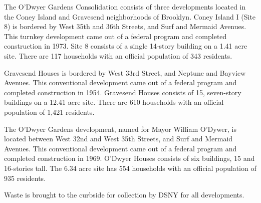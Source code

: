 The O'Dwyer Gardens Consolidation consists of three developments located in the Coney Island and Gravesend neighborhoods of Brooklyn. Coney Island I (Site 8) is bordered by West 35th and 36th Streets, and Surf and Mermaid Avenues. This turnkey development came out of a federal program and completed construction in 1973. Site 8 consists of a single 14-story building on a 1.41 acre site. There are 117 households with an official population of 343 residents.\par \vspace{.7\baselineskip}Gravesend Houses is bordered by West 33rd Street, and Neptune and Bayview Avenues. This conventional development came out of a federal program and completed construction in 1954. Gravesend Houses consists of 15, seven-story buildings on a 12.41 acre site. There are 610 households with an official population of 1,421 residents. \par \vspace{.7\baselineskip}The O'Dwyer Gardens development, named for Mayor William O'Dywer, is located between West 32nd and West 35th Streets, and Surf and Mermaid Avenues. This conventional development came out of a federal program and completed construction in 1969. O'Dwyer Houses consists of six buildings, 15 and 16-stories tall. The 6.34 acre site has 554 households with an official population of 935 residents.\par \vspace{.7\baselineskip}Waste is brought to the curbside for collection by DSNY for all developments.